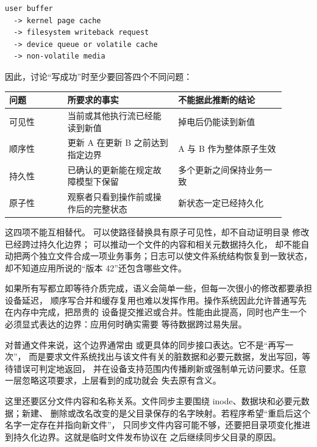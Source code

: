 \begin{lstlisting}
user buffer
  -> kernel page cache
  -> filesystem writeback request
  -> device queue or volatile cache
  -> non-volatile media
\end{lstlisting}

因此，讨论“写成功”时至少要回答四个不同问题：

\begin{longtable}{@{}F{0.19\linewidth}F{0.36\linewidth}F{0.35\linewidth}@{}}
\toprule
{}
问题 & 所要求的事实 & 不能据此推断的结论 \\
\midrule
可见性 & 当前或其他执行流已经能读到新值 & 掉电后仍能读到新值 \\\tablerowrule
顺序性 & 更新 A 在更新 B 之前达到指定边界 & A 与 B 作为整体原子生效 \\\tablerowrule
持久性 & 已确认的更新能在规定故障模型下保留 & 多个更新之间保持业务一致 \\\tablerowrule
原子性 & 观察者只看到操作前或操作后的完整状态 & 新状态一定已经持久化 \\
\bottomrule
\end{longtable}

这四项不能互相替代。 可以使路径替换具有原子可见性，却不自动证明目录
修改已经跨过持久化边界； 可以推动一个文件的内容和相关元数据持久化，
却不能自动把两个独立文件合成一项业务事务；日志可以使文件系统结构恢复到一致状态，
却不知道应用所说的“版本 42”还包含哪些文件。


如果所有写都立即等待介质完成，语义会简单一些，但每一次很小的修改都要承担设备延迟，
顺序写合并和缓存复用也难以发挥作用。操作系统因此允许普通写先在内存中完成，把昂贵的
设备提交推迟或合并。性能由此提高，同时也产生一个必须显式表达的边界：应用何时确实需要
等待数据跨过易失层。

对普通文件来说，这个边界通常由  或更具体的同步接口表达。它不是“再写一次”，
而是要求文件系统找出与该文件有关的脏数据和必要元数据，发出写回，等待错误可判定地返回，
并在设备支持范围内传播刷新或强制单元访问要求。任意一层忽略这项要求，上层看到的成功就会
失去原有含义。

这里还要区分文件内容和名称关系。文件同步主要围绕 inode、数据块和必要元数据；新建、
删除或改名改变的是父目录保存的名字映射。若程序希望“重启后这个名字一定存在并指向新文件”，
只同步文件内容可能不够，还要把目录项变化推进到持久化边界。这就是临时文件发布协议在
 之后继续同步父目录的原因。


